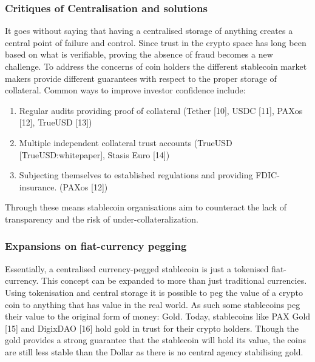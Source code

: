 \documentclass[english,]{IEEEtran}
\providecommand{\tightlist}{%
  \setlength{\itemsep}{0pt}\setlength{\parskip}{0pt}}
\begin{document}
\subsubsection{Critiques of Centralisation and
solutions}\label{critiques-of-centralisation-and-solutions}

It goes without saying that having a centralised storage of anything
creates a central point of failure and control. Since trust in the
crypto space has long been based on what is verifiable, proving the
absence of fraud becomes a new challenge. To address the concerns of
coin holders the different stablecoin market makers provide different
guarantees with respect to the proper storage of collateral. Common ways
to improve investor confidence include:

\begin{enumerate}
\def\labelenumi{\arabic{enumi}.}
\tightlist
\item
  Regular audits providing proof of collateral (Tether {[}10{]}, USDC
  {[}11{]}, PAXos {[}12{]}, TrueUSD {[}13{]})
\item
  Multiple independent collateral trust accounts (TrueUSD
  {[}TrueUSD:whitepaper{]}, Stasis Euro {[}14{]})
\item
  Subjecting themselves to established regulations and providing FDIC-
  insurance. (PAXos {[}12{]})
\end{enumerate}

Through these means stablecoin organisations aim to counteract the lack
of transparency and the risk of under-collateralization.

\subsubsection{Expansions on fiat-currency
pegging}\label{expansions-on-fiat-currency-pegging}

Essentially, a centralised currency-pegged stablecoin is just a
tokenised fiat-currency. This concept can be expanded to more than just
traditional currencies. Using tokenisation and central storage it is
possible to peg the value of a crypto coin to anything that has value in
the real world. As such some stablecoins peg their value to the original
form of money: Gold. Today, stablecoins like PAX Gold {[}15{]} and
DigixDAO {[}16{]} hold gold in trust for their crypto holders. Though
the gold provides a strong guarantee that the stablecoin will hold its
value, the coins are still less stable than the Dollar as there is no
central agency stabilising gold.
\end{document}
